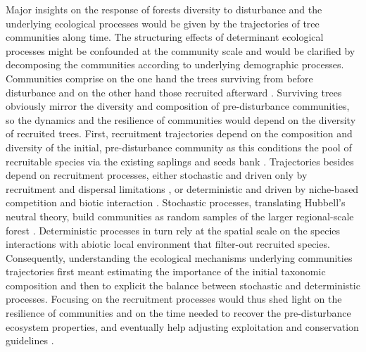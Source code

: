 \documentclass[fleqn,10pt]{ArtEcoFoG} %
\begin{document}
Major insights on the response of forests diversity to disturbance and
the underlying ecological processes would be given by the trajectories
of tree communities along time. The structuring effects of determinant ecological 
processes might be confounded at the community scale
\citep{Chave2004} and would be clarified by decomposing the communities
according to underlying demographic processes. Communities comprise on
the one hand the trees surviving from before disturbance and on the
other hand those recruited afterward \citep{Herault2018}. Surviving
trees obviously mirror the diversity and composition of
pre-disturbance communities, so the dynamics and the resilience of
communities would depend on the diversity of recruited trees. First,
recruitment trajectories depend on the composition and diversity of the
initial, pre-disturbance community as this conditions the pool of
recruitable species via the existing saplings and seeds bank
\citep{Herault2018}. Trajectories besides depend on recruitment
processes, either stochastic and driven only by recruitment and dispersal
limitations \citep{Hurtt1995, Hubbell2001}, or deterministic and driven
by niche-based competition and biotic interaction \citep{Adler2007}.
Stochastic processes, translating Hubbell's neutral theory, build
communities as random samples of the larger regional-scale forest
\citep{Hubbell2001, Chave2004}. Deterministic processes in turn rely at
the spatial scale on the species interactions with abiotic
local environment that filter-out recruited species.
Consequently, understanding the ecological mechanisms underlying communities trajectories first meant estimating the importance of the initial taxonomic composition and then
to explicit the balance between stochastic and deterministic processes.
Focusing on the recruitment processes would thus shed light on the resilience of
communities and on the time needed to recover the pre-disturbance
ecosystem properties, and eventually help adjusting exploitation and
conservation guidelines \citep{Diaz2005, Gardner2007, Schwartz2017}.
\end{document}
